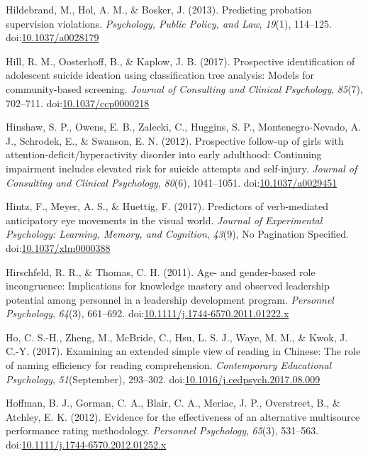 \documentclass[english,man]{apa6}
\theoremstyle{definition}
\theoremstyle{definition}
\theoremstyle{definition}
\theoremstyle{remark}
\begin{document}
\hypertarget{ref-Hildebrand2013}{}
Hildebrand, M., Hol, A. M., \& Bosker, J. (2013). Predicting probation
supervision violations. \emph{Psychology, Public Policy, and Law},
\emph{19}(1), 114--125.
doi:\href{https://doi.org/10.1037/a0028179}{10.1037/a0028179}

\hypertarget{ref-Hill2017}{}
Hill, R. M., Oosterhoff, B., \& Kaplow, J. B. (2017). Prospective
identification of adolescent suicide ideation using classification tree
analysis: Models for community-based screening. \emph{Journal of
Consulting and Clinical Psychology}, \emph{85}(7), 702--711.
doi:\href{https://doi.org/10.1037/ccp0000218}{10.1037/ccp0000218}

\hypertarget{ref-Hinshaw2012}{}
Hinshaw, S. P., Owens, E. B., Zalecki, C., Huggins, S. P.,
Montenegro-Nevado, A. J., Schrodek, E., \& Swanson, E. N. (2012).
Prospective follow-up of girls with attention-deficit/hyperactivity
disorder into early adulthood: Continuing impairment includes elevated
risk for suicide attempts and self-injury. \emph{Journal of Consulting
and Clinical Psychology}, \emph{80}(6), 1041--1051.
doi:\href{https://doi.org/10.1037/a0029451}{10.1037/a0029451}

\hypertarget{ref-Hintz2017}{}
Hintz, F., Meyer, A. S., \& Huettig, F. (2017). Predictors of
verb-mediated anticipatory eye movements in the visual world.
\emph{Journal of Experimental Psychology: Learning, Memory, and
Cognition}, \emph{43}(9), No Pagination Specified.
doi:\href{https://doi.org/10.1037/xlm0000388}{10.1037/xlm0000388}

\hypertarget{ref-Hirschfeld2011}{}
Hirschfeld, R. R., \& Thomas, C. H. (2011). Age- and gender-based role
incongruence: Implications for knowledge mastery and observed leadership
potential among personnel in a leadership development program.
\emph{Personnel Psychology}, \emph{64}(3), 661--692.
doi:\href{https://doi.org/10.1111/j.1744-6570.2011.01222.x}{10.1111/j.1744-6570.2011.01222.x}

\hypertarget{ref-Ho2017}{}
Ho, C. S.-H., Zheng, M., McBride, C., Hsu, L. S. J., Waye, M. M., \&
Kwok, J. C.-Y. (2017). Examining an extended simple view of reading in
Chinese: The role of naming efficiency for reading comprehension.
\emph{Contemporary Educational Psychology}, \emph{51}(September),
293--302.
doi:\href{https://doi.org/10.1016/j.cedpsych.2017.08.009}{10.1016/j.cedpsych.2017.08.009}

\hypertarget{ref-Hoffman2012}{}
Hoffman, B. J., Gorman, C. A., Blair, C. A., Meriac, J. P., Overstreet,
B., \& Atchley, E. K. (2012). Evidence for the effectiveness of an
alternative multisource performance rating methodology. \emph{Personnel
Psychology}, \emph{65}(3), 531--563.
doi:\href{https://doi.org/10.1111/j.1744-6570.2012.01252.x}{10.1111/j.1744-6570.2012.01252.x}
\end{document}

